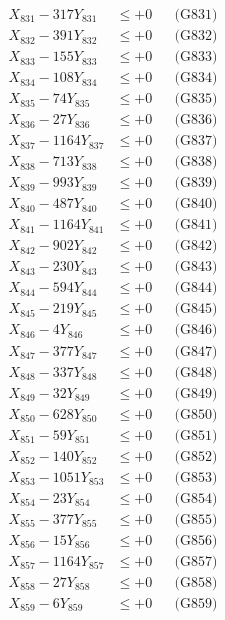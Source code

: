 \documentclass[a4paper,10pt]{article}
\begin{document}
{\begin{align}
\allowbreak
X_{831} - 317Y_{831} &\leq +0 && \text{(G831)} \\
X_{832} - 391Y_{832} &\leq +0 && \text{(G832)} \\
X_{833} - 155Y_{833} &\leq +0 && \text{(G833)} \\
X_{834} - 108Y_{834} &\leq +0 && \text{(G834)} \\
X_{835} - 74Y_{835} &\leq +0 && \text{(G835)} \\
X_{836} - 27Y_{836} &\leq +0 && \text{(G836)} \\
X_{837} - 1164Y_{837} &\leq +0 && \text{(G837)} \\
X_{838} - 713Y_{838} &\leq +0 && \text{(G838)} \\
X_{839} - 993Y_{839} &\leq +0 && \text{(G839)} \\
X_{840} - 487Y_{840} &\leq +0 && \text{(G840)} \\
\allowbreak
X_{841} - 1164Y_{841} &\leq +0 && \text{(G841)} \\
X_{842} - 902Y_{842} &\leq +0 && \text{(G842)} \\
X_{843} - 230Y_{843} &\leq +0 && \text{(G843)} \\
X_{844} - 594Y_{844} &\leq +0 && \text{(G844)} \\
X_{845} - 219Y_{845} &\leq +0 && \text{(G845)} \\
X_{846} - 4Y_{846} &\leq +0 && \text{(G846)} \\
X_{847} - 377Y_{847} &\leq +0 && \text{(G847)} \\
X_{848} - 337Y_{848} &\leq +0 && \text{(G848)} \\
X_{849} - 32Y_{849} &\leq +0 && \text{(G849)} \\
X_{850} - 628Y_{850} &\leq +0 && \text{(G850)} \\
\allowbreak
X_{851} - 59Y_{851} &\leq +0 && \text{(G851)} \\
X_{852} - 140Y_{852} &\leq +0 && \text{(G852)} \\
X_{853} - 1051Y_{853} &\leq +0 && \text{(G853)} \\
X_{854} - 23Y_{854} &\leq +0 && \text{(G854)} \\
X_{855} - 377Y_{855} &\leq +0 && \text{(G855)} \\
X_{856} - 15Y_{856} &\leq +0 && \text{(G856)} \\
X_{857} - 1164Y_{857} &\leq +0 && \text{(G857)} \\
X_{858} - 27Y_{858} &\leq +0 && \text{(G858)} \\
X_{859} - 6Y_{859} &\leq +0 && \text{(G859)} \\

\end{align}}
\end{document}
